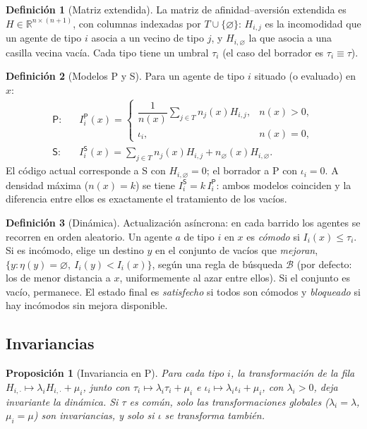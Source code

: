 \documentclass[11pt,a4paper]{article}
\theoremstyle{plain}
\newtheorem{proposicion}{Proposición}
\theoremstyle{definition}
\newtheorem{definicion}{Definición}
\theoremstyle{remark}
\newcommand{\vac}{\varnothing}
\newcommand{\R}{\mathbb{R}}
\newcommand{\modP}{\textsf{P}}
\newcommand{\modS}{\textsf{S}}
\begin{document}
\begin{definicion}[Matriz extendida]
La matriz de afinidad--aversión extendida es
$H\in\R^{n\times(n+1)}$, con columnas indexadas por $T\cup\{\vac\}$:
$H_{i,j}$ es la incomodidad que un agente de tipo $i$ asocia a un vecino de tipo
$j$, y $H_{i,\vac}$ la que asocia a una casilla vecina vacía. Cada tipo tiene
un umbral $\tau_i$ (el caso del borrador es $\tau_i\equiv\tau$).
\end{definicion}

\begin{definicion}[Modelos \modP{} y \modS]
Para un agente de tipo $i$ situado (o evaluado) en $x$:
\begin{align*}
 \modP:&\quad I^{\modP}_i(x)=
 \begin{cases}\dfrac{1}{n(x)}\displaystyle\sum_{j\in T}n_j(x)H_{i,j},& n(x)>0,\\[2mm]
 \iota_i,& n(x)=0,\end{cases}\\
 \modS:&\quad I^{\modS}_i(x)=\sum_{j\in T}n_j(x)H_{i,j}+n_\vac(x)H_{i,\vac}.
\end{align*}
El código actual corresponde a \modS{} con $H_{i,\vac}=0$; el borrador a
\modP{} con $\iota_i=0$. A densidad máxima ($n(x)=k$) se tiene
$I^{\modS}_i=k\,I^{\modP}_i$: ambos modelos coinciden y la diferencia entre
ellos es exactamente el tratamiento de los vacíos.
\end{definicion}

\begin{definicion}[Dinámica]
Actualización asíncrona: en cada barrido los agentes se recorren en orden
aleatorio. Un agente $a$ de tipo $i$ en $x$ es \emph{cómodo} si
$I_i(x)\le\tau_i$. Si es incómodo, elige un destino $y$ en el conjunto de
vacíos que \emph{mejoran}, $\{y:\eta(y)=\vac,\ I_i(y)<I_i(x)\}$, según una
regla de búsqueda $\mathcal B$ (por defecto: los de menor distancia a $x$,
uniformemente al azar entre ellos). Si el conjunto es vacío, permanece. El
estado final es \emph{satisfecho} si todos son cómodos y \emph{bloqueado} si hay
incómodos sin mejora disponible.
\end{definicion}

\subsection{Invariancias}

\begin{proposicion}[Invariancia en \modP]\label{prop:invP}
Para cada tipo $i$, la transformación de la fila
$H_{i,\cdot}\mapsto\lambda_iH_{i,\cdot}+\mu_i$, junto con
$\tau_i\mapsto\lambda_i\tau_i+\mu_i$ e $\iota_i\mapsto\lambda_i\iota_i+\mu_i$,
con $\lambda_i>0$, deja invariante la dinámica. Si $\tau$ es común, solo las
transformaciones globales ($\lambda_i=\lambda$, $\mu_i=\mu$) son invariancias,
y solo si $\iota$ se transforma también.
\end{proposicion}
\end{document}
